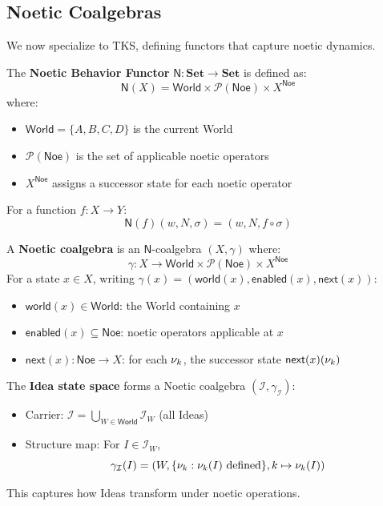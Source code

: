 \subsection{Noetic Coalgebras}
\label{subsec:noetic-coalgebras}

We now specialize to TKS, defining functors that capture noetic dynamics.

\begin{definition}
\label{def:noetic-behavior-functor}
The \textbf{Noetic Behavior Functor} $\mathsf{N} : \mathbf{Set} \to \mathbf{Set}$ is defined as:
\[
  \mathsf{N}(X) = \mathsf{World} \times \mathcal{P}(\mathsf{Noe}) \times X^{\mathsf{Noe}}
\]
where:
\begin{itemize}
  \item $\mathsf{World} = \{A, B, C, D\}$ is the current World
  \item $\mathcal{P}(\mathsf{Noe})$ is the set of applicable noetic operators
  \item $X^{\mathsf{Noe}}$ assigns a successor state for each noetic operator
\end{itemize}

For a function $f : X \to Y$:
\[
  \mathsf{N}(f)(w, N, \sigma) = (w, N, f \circ \sigma)
\]
\end{definition}

\begin{definition}
\label{def:noetic-coalgebra}
A \textbf{Noetic coalgebra} is an $\mathsf{N}$-coalgebra $(X, \gamma)$ where:
\[
  \gamma : X \to \mathsf{World} \times \mathcal{P}(\mathsf{Noe}) \times X^{\mathsf{Noe}}
\]
For a state $x \in X$, writing $\gamma(x) = (\mathsf{world}(x), \mathsf{enabled}(x), \mathsf{next}(x))$:
\begin{itemize}
  \item $\mathsf{world}(x) \in \mathsf{World}$: the World containing $x$
  \item $\mathsf{enabled}(x) \subseteq \mathsf{Noe}$: noetic operators applicable at $x$
  \item $\mathsf{next}(x) : \mathsf{Noe} \to X$: for each $\nu_{k}$, the successor state $\mathsf{next}(x)(\nu_{k})$
\end{itemize}
\end{definition}

\begin{example}
\label{ex:idea-coalgebra}
The \textbf{Idea state space} forms a Noetic coalgebra $(\mathcal{I}, \gamma_{\mathcal{I}})$:
\begin{itemize}
  \item Carrier: $\mathcal{I} = \bigcup_{W \in \mathsf{World}} \mathcal{I}_W$ (all Ideas)
  \item Structure map: For $I \in \mathcal{I}_W$,
  \[
    \gamma_{\mathcal{I}}(I) = (W, \{\nu_{k} : \nu_{k}(I) \text{ defined}\}, k \mapsto \nu_{k}(I))
  \]
\end{itemize}
This captures how Ideas transform under noetic operations.
\end{example}

